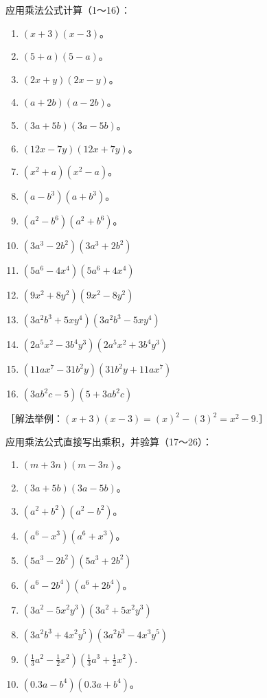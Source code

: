 应用乘法公式计算（1～16）：

\begin{enumerate}[start=1]
\item
  \((x + 3)(x - 3)\)。
\item
  \((5 + a)(5 - a)\)。
\item
  \((2x + y)(2x - y)\)。
\item
  \((a + 2b)(a - 2b)\)。
\item
  \((3a + 5b)(3a - 5b)\)。
\item
  \((12x - 7y)(12x + 7y)\)。
\item
  \((x^{2} + a)(x^{2} - a)\)。
\item
  \((a - b^3)(a + b^3)\)。
\item
  \((a^2 - b^6)(a^2 + b^6)\)。
\item
  \((3a^{3} - 2b^{2})(3a^{3} + 2b^{2})\)
\item
  \((5a^{6} - 4x^{4})(5a^{6} + 4x^{4})\)
\item
  \((9x^{2} + 8y^{2})(9x^{2} - 8y^{2})\)
\item
  \((3a^{2}b^{3} + 5xy^{4})(3a^{2}b^{3} - 5xy^{4})\)
\item
  \((2a^{5}x^{2} - 3b^{4}y^{3})(2a^{5}x^{2} + 3b^{4}y^{3})\)
\item
  \((11ax^{7} - 31b^{2}y)(31b^{2}y + 11ax^{7})\)
\item
  \((3ab^{2}c - 5)(5 + 3ab^{2}c)\)
\end{enumerate}

［解法举例：\((x + 3)(x - 3) = (x)^2 - (3)^2 = x^2 - 9.\)］

应用乘法公式直接写出乘积，并验算（17～26）：

\begin{enumerate}[start=17]
\item
  \((m + 3n)(m - 3n)\)。
\item
  \((3a + 5b)(3a - 5b)\)。
\item
  \((a^2 + b^2)(a^2 - b^2)\)。
\item
  \((a^6 - x^3)(a^6 + x^3)\)。
\item
  \((5a^{3} - 2b^{2})(5a^{3} + 2b^{2})\)
\item
  \((a^6 - 2b^4)(a^6 + 2b^4)\)。
\item
  \((3a^{2} - 5x^{2}y^{3})(3a^{2} + 5x^{2}y^{3})\)
\item
  \((3a^{2}b^{3} + 4x^{2}y^{5})(3a^{2}b^{3} - 4x^{3}y^{5})\)
\item
  \(\left(\frac{1}{3} a^2 -\frac{1}{2} x^2\right)\left(\frac{1}{3} a^3 +\frac{1}{2} x^2\right).\)
\item
  \((0.3a - b^4)(0.3a + b^4)\)。
\end{enumerate}

